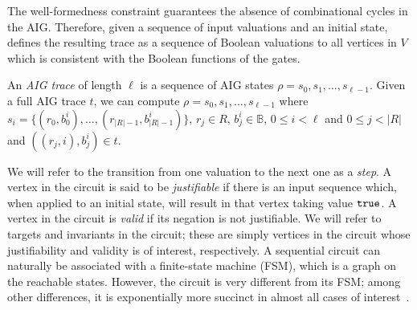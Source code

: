   The well-formedness constraint guarantees the absence of combinational cycles in the 
AIG. Therefore, 
given a sequence of input valuations and an initial state, 
 defines the resulting trace as a 
sequence of Boolean valuations to all vertices in $V$
which is consistent with the Boolean functions of the
gates. 



%
\begin{definition}
An {\em AIG trace} of length $\ell$ is a sequence of AIG states 
$\rho = s_0,s_1,\ldots,s_{\ell-1}$. 
Given a full AIG trace $t$, 
we can compute $\rho=s_0,s_1,\ldots,s_{\ell-1}$ where 
$s_i=\{ (r_0,b_0^i), \ldots, (r_{|R|-1}, b_{|R|-1}^i)\}$, 
$r_j\in R$, $b_j^i \in \mathbb{B}$, $0\le i < \ell$ and $0\le j < |R|$ 
and $( (r_j, i), b_j^i) \in t$. 
\end{definition}


%
We will refer to the transition from one valuation
to the next one as a {\em step}.  A vertex in the circuit is
said to be \emph{justifiable} if there is an input sequence which, when
applied to an initial state, will result in that vertex
taking value $\mathtt{true}$.  A vertex in the circuit is
\emph{valid} if its negation is not justifiable.  We will refer
to targets and invariants in the circuit; these are simply
vertices in the circuit whose justifiability and validity
is of interest, respectively.
A sequential circuit can naturally
be associated with a finite-state machine (FSM),
which is a graph on the reachable states.  However, the 
circuit is very different from its FSM; among
other differences, it is exponentially more succinct in
almost all cases of interest~\cite{BuClMcDiHw92}. 
%
%
